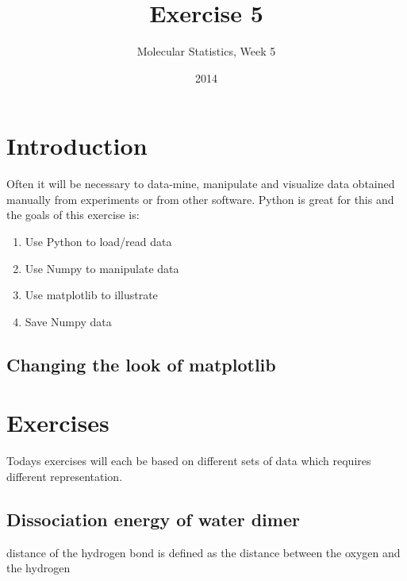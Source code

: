 \documentclass{article}
\title{Exercise 5}
\author{Molecular Statistics, Week 5}
\date{2014}
\begin{document}

\maketitle

\section{Introduction}

Often it will be necessary to data-mine, manipulate and visualize data obtained manually from experiments or from other software.
Python is great for this and the goals of this exercise is:

\begin{enumerate}
    \item Use Python to load/read data

    \item Use Numpy to manipulate data

    \item Use matplotlib to illustrate 

    \item Save Numpy data

\end{enumerate}


\subsection{Changing the look of matplotlib}







\newpage
\section{Exercises}

Todays exercises will each be based on different sets of data which requires different representation. 

\subsection{Dissociation energy of water dimer}

distance of the hydrogen bond is defined as the distance between the oxygen and the hydrogen
\end{document}
